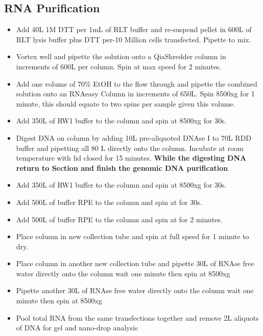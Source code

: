 \documentclass[a4paper]{article}
\begin{document}
    
    
    \subsection{RNA Purification} \label{RNA Purification}
    	\begin{itemize}
        
        	\item Add 40\textmu L 1M DTT per 1mL of RLT buffer and re-suspend pellet in 600\textmu L of RLT lysis buffer plus DTT per-10 Million cells transfected. Pipette to mix. 
        
        	\item Vortex well and pipette the solution onto a QiaShredder column in increments of 600\textmu L per column. Spin at max speed for 2 minutes.
            
            \item Add one volume of 70\% EtOH to the flow through and pipette the combined solution onto an RNAeasy Column in increments of 650\textmu L. Spin 8500xg for 1 minute, this should equate to two spins per sample given this volume.
            
            \item Add 350\textmu L of RW1 buffer to the column and spin at 8500xg for 30s.
            
            \item Digest DNA on column by adding 10\textmu L pre-aliquoted DNAse I to 70\textmu L RDD buffer and pipetting all 80 \textmu L directly onto the column. Incubate at room temperature with lid closed for 15 minutes. \textbf{While the digesting DNA return to Section \label{Genomic Purification} and finish the genomic DNA purification}
            
            \item Add 350\textmu L of RW1 buffer to the column and spin at 8500xg for 30s.
            
            \item Add 500\textmu L of buffer RPE to the column and spin at for 30s.
            
            \item Add 500\textmu L of buffer RPE to the column and spin at for 2 minutes.
            
            \item Place column in new collection tube and spin at full speed for 1 minute to dry.
            
            \item Place column in another new collection tube and pipette 30\textmu L of RNAse free water directly onto the column wait one minute then spin at 8500xg 
        
        	 \item Pipette another 30\textmu L of RNAse free water directly onto the column wait one minute then spin at 8500xg
        
			\item Pool total RNA from the same transfections together and remove 2\textmu L aliquots of DNA for gel and nano-drop analysis        
        \end{itemize}
        
\end{document}
